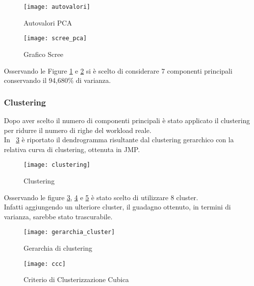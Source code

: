 \begin{figure}[!htbp]
  \centering
  \texttt{[image: autovalori]}
  \caption{Autovalori PCA}
  \label{webserver_autovalori}
\end{figure}
\clearpage

\begin{figure}[!htbp]
  \centering
  \texttt{[image: scree\_pca]}
  \caption{Grafico Scree}
  \label{webserver_scree_pca}
\end{figure}

Osservando le Figure \ref{webserver_autovalori} e \ref{webserver_scree_pca} si è scelto di considerare
7 componenti principali conservando il 94,680\% di varianza.

\clearpage

\subsubsection{Clustering}
Dopo aver scelto il numero di componenti principali è stato applicato il clustering
per ridurre il numero di righe del workload reale.\\
In \figurename~\ref{webserver_clustering} è riportato il dendrogramma risultante dal
clustering gerarchico con la relativa curva di clustering, ottenuta in JMP.\\

\begin{figure}[!htbp]
  \centering
  \texttt{[image: clustering]}
  \caption{Clustering}
  \label{webserver_clustering}
\end{figure}
\clearpage

Osservando le figure \ref{webserver_clustering}, \ref{webserver_gerarchia_cluster} e \ref{webserver_ccc}
è stato scelto di utilizzare 8 cluster.\\
Infatti aggiungendo un ulteriore cluster, il guadagno ottenuto, in termini di varianza,
sarebbe stato trascurabile.\\

\begin{minipage}{\linewidth}
  \centering
  \begin{minipage}{0.48\linewidth}
    \begin{figure}[H]
      \texttt{[image: gerarchia\_cluster]}
      \label{webserver_gerarchia_cluster}
      \caption{Gerarchia di clustering}
    \end{figure}
  \end{minipage}
  \begin{minipage}{0.48\linewidth}
    \begin{figure}[H]
      \texttt{[image: ccc]}
      \label{webserver_ccc}
      \caption{Criterio di Clusterizzazione Cubica}
    \end{figure}
  \end{minipage}
\end{minipage}

